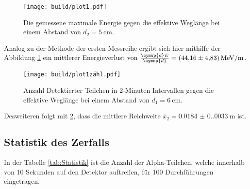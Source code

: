 \begin{figure}[H]
  \texttt{[image: build/plot1.pdf]}
  \caption{Die gemessene maximale Energie gegen die effektive Weglänge bei einem Abstand von $d_2=\qty{5}{\centi\meter}$.}
  \label{fig:energie2}
\end{figure}

Analog zu der Methode der ersten Messreihe ergibt sich hier mithilfe der Abbildung \ref{fig:energie2} 
ein mittlerer Energieverlust von $\frac{\symup{d}E}{\symup{d}}=\qty{44.16(4.83)}{\mega\electronvolt\per\meter}$.

\begin{figure}[H]
  \texttt{[image: build/plot1zähl.pdf]}
  \caption{Anzahl Detektierter Teilchen in 2-Minuten Intervallen gegen die effektive Weglänge bei einem Abstand von $d_1=\qty{6}{\centi\meter}$.}
  \label{fig:zaehl2}
\end{figure}

Desweiteren folgt mit \ref{fig:zaehl2}, dass die mittlere Reichweite $\bar{x}_2=\qty{0.0184(0.0033)}{\meter}$ ist.

\subsection{Statistik des Zerfalls}

In der Tabelle \ref{tab:Statistik} ist die Anzahl der Alpha-Teilchen, welche innerhalb von 10 Sekunden auf den Detektor auftreffen, für 100 Durchführungen eingetragen. 



